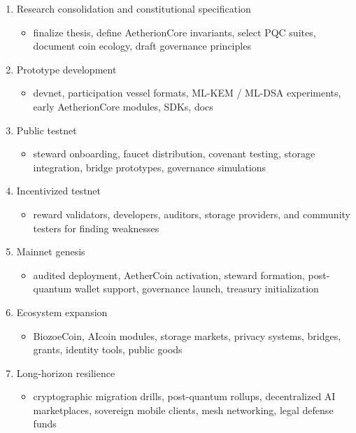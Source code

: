 ﻿\documentclass[12pt]{article}
\begin{document}
\begin{enumerate}
  \item Research consolidation and constitutional specification
  \begin{itemize}
    \item finalize thesis, define AetherionCore invariants, select PQC suites, document coin ecology, draft governance principles
  \end{itemize}
  \item Prototype development
  \begin{itemize}
    \item devnet, participation vessel formats, ML-KEM / ML-DSA experiments, early AetherionCore modules, SDKs, docs
  \end{itemize}
  \item Public testnet
  \begin{itemize}
    \item steward onboarding, faucet distribution, covenant testing, storage integration, bridge prototypes, governance simulations
  \end{itemize}
  \item Incentivized testnet
  \begin{itemize}
    \item reward validators, developers, auditors, storage providers, and community testers for finding weaknesses
  \end{itemize}
  \item Mainnet genesis
  \begin{itemize}
    \item audited deployment, AetherCoin activation, steward formation, post-quantum wallet support, governance launch, treasury initialization
  \end{itemize}
  \item Ecosystem expansion
  \begin{itemize}
    \item BiozoeCoin, AIcoin modules, storage markets, privacy systems, bridges, grants, identity tools, public goods
  \end{itemize}
  \item Long-horizon resilience
  \begin{itemize}
    \item cryptographic migration drills, post-quantum rollups, decentralized AI marketplaces, sovereign mobile clients, mesh networking, legal defense funds
  \end{itemize}
\end{enumerate}
\end{document}

